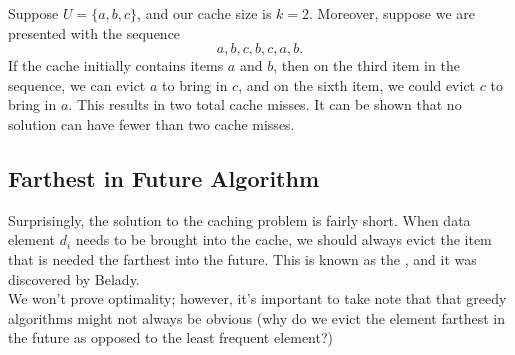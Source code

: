 \begin{example}
Suppose $U = \{a, b, c\}$, and our cache size is $k = 2$. Moreover, suppose we are presented with the sequence 
\[
a,b,c,b,c,a,b.
\]
If the cache initially contains items $a$ and $b$, then on the third item in the sequence, we can evict $a$ to bring in $c$, and on the sixth item, we could evict $c$ to bring in $a$. This results in two total cache misses. It can be shown that no solution can have fewer than two cache misses.
\end{example}


\subsection{Farthest in Future Algorithm}

Surprisingly, the solution to the caching problem is fairly short.  When data element $d_i$ needs to be brought into the cache, we should always evict the item that is needed the farthest into the future. This is known as the , and it was discovered by Belady. \\

We won't prove optimality; however, it's important to take note that that greedy algorithms might not always be obvious (why do we evict the element farthest in the future as opposed to the least frequent element?) 
